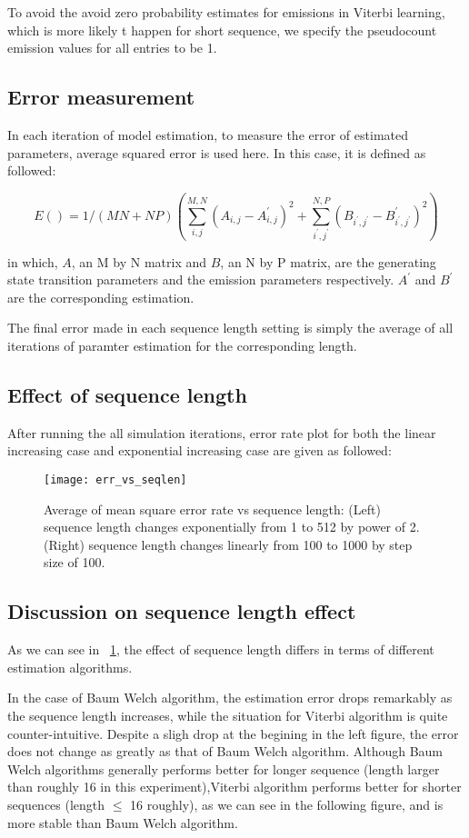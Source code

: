 \documentclass[paper=a4, fontsize=11pt]{scrartcl} %
\numberwithin{equation}{section} %
\numberwithin{figure}{section} %
\numberwithin{table}{section} %
\begin{document}
To avoid the avoid zero probability estimates for emissions in Viterbi learning, which is more likely t happen for short sequence, we specify the pseudocount emission values for all entries to be 1.

\subsection {Error measurement}
In each iteration of model estimation, to measure the error of estimated parameters, average squared error is used here. In this case, it is defined as followed:

\[ E () = 1 / (M N + N P) (\sum\limits_{i,j}^{M,N} (A_{i,j} - A^{'}_{i,j})^{2} + \sum\limits_{i^{'},j^{'}}^{N,P} (B_{i^{'},j^{'}} - B^{'}_{i^{'},j^{'}})^{2})\]

in which, $A$, an M by N matrix and $B$, an N by P matrix, are the generating  state transition parameters and the emission parameters respectively.  $A^{'}$  and $B^{'}$ are the corresponding estimation.

The final error made in each sequence length setting is simply the average of all iterations of paramter estimation for the corresponding length.

\subsection {Effect of sequence length}

After running the all simulation iterations, error rate plot for both the linear increasing case and exponential increasing case are given as followed:

\begin{figure}[H]
  \centering
  \texttt{[image: err\_vs\_seqlen]}
  \caption {Average of mean square error rate vs sequence length: (Left) sequence length changes exponentially from 1 to 512 by power of 2. (Right) sequence length changes linearly from 100 to 1000 by step size of 100.}
  \label{fig:6.err_vs_seqlen}
\end{figure}

\subsection {Discussion on sequence length effect}

As we can see in ~\ref{fig:6.err_vs_seqlen}, the effect of sequence length differs in terms of different estimation algorithms. 

In the case of Baum Welch algorithm, the estimation error drops remarkably as the sequence length increases, while the situation for Viterbi algorithm is quite counter-intuitive. Despite a sligh drop at the begining in the left figure, the error does not change as greatly as that of Baum Welch algorithm. Although Baum Welch algorithms generally performs better for longer sequence (length larger than roughly 16 in this experiment),Viterbi algorithm performs better for shorter sequences (length $\le$ 16 roughly), as we can see in the following figure, and is more stable than Baum Welch algorithm.
\end{document}
